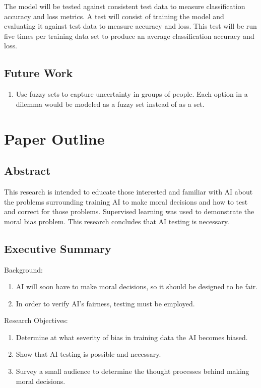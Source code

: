 \documentclass{article}
\begin{document}
The model will be tested against consistent test data to measure classification accuracy and loss metrics. A test will consist of training the model and evaluating it against test data to measure accuracy and loss. This test will be run five times per training data set to produce an average classification accuracy and loss.

\subsection{Future Work}

\begin{enumerate}
    \item Use fuzzy sets to capture uncertainty in groups of people. Each option in a dilemma would be modeled as a fuzzy set instead of as a set.
\end{enumerate}

\section{Paper Outline}

\subsection{Abstract}

This research is intended to educate those interested and familiar with AI about the problems surrounding training AI to make moral decisions and how to test and correct for those problems. Supervised learning was used to demonstrate the moral bias problem. This research concludes that AI testing is necessary.

\subsection{Executive Summary}

Background:
\begin{enumerate}
    \item AI will soon have to make moral decisions, so it should be designed to be fair.
    \item In order to verify AI's fairness, testing must be employed.
\end{enumerate}

Research Objectives:
\begin{enumerate}
    \item Determine at what severity of bias in training data the AI becomes biased.
    \item Show that AI testing is possible and necessary.
    \item Survey a small audience to determine the thought processes behind making moral decisions.
\end{enumerate}
\end{document}
